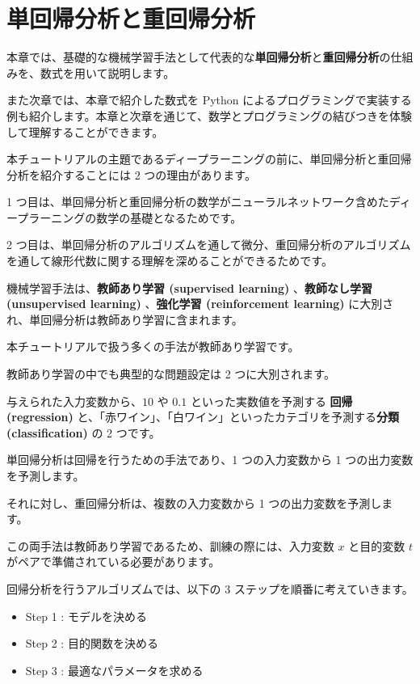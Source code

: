 \chapter{単回帰分析と重回帰分析}


本章では、基礎的な機械学習手法として代表的な\textbf{単回帰分析}と\textbf{重回帰分析}の仕組みを、数式を用いて説明します。

また次章では、本章で紹介した数式を Python によるプログラミングで実装する例も紹介します。本章と次章を通じて、数学とプログラミングの結びつきを体験して理解することができます。


本チュートリアルの主題であるディープラーニングの前に、単回帰分析と重回帰分析を紹介することには 2 つの理由があります。

1 つ目は、単回帰分析と重回帰分析の数学がニューラルネットワーク含めたディープラーニングの数学の基礎となるためです。

2 つ目は、単回帰分析のアルゴリズムを通して微分、重回帰分析のアルゴリズムを通して線形代数に関する理解を深めることができるためです。


機械学習手法は、\textbf{教師あり学習 (supervised learning)} 、\textbf{教師なし学習 (unsupervised learning)} 、\textbf{強化学習 (reinforcement learning)} に大別され、単回帰分析は教師あり学習に含まれます。

本チュートリアルで扱う多くの手法が教師あり学習です。


教師あり学習の中でも典型的な問題設定は 2 つに大別されます。

与えられた入力変数から、$10$ や $0.1$ といった実数値を予測する \textbf{回帰 (regression)} と、「赤ワイン」、「白ワイン」といったカテゴリを予測する\textbf{分類 (classification)} の 2 つです。


単回帰分析は回帰を行うための手法であり、1 つの入力変数から 1 つの出力変数を予測します。

それに対し、重回帰分析は、複数の入力変数から 1 つの出力変数を予測します。

この両手法は教師あり学習であるため、訓練の際には、入力変数 $x$ と目的変数 $t$ がペアで準備されている必要があります。


回帰分析を行うアルゴリズムでは、以下の 3 ステップを順番に考えていきます。


\begin{itemize}
\item Step 1 : モデルを決める
\item Step 2 : 目的関数を決める
\item Step 3 : 最適なパラメータを求める
\end{itemize}


